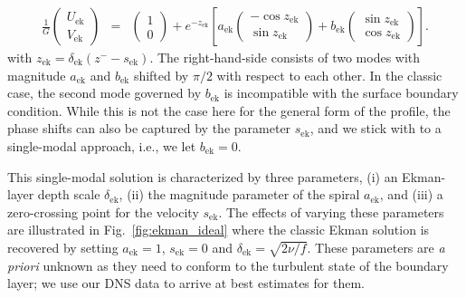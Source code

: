 \documentclass[smallcondensed,final]{svjour3}
\begin{document}
\begin{subequations}
  \label{eqn:profile_ekman}
  \begin{eqnarray}
    \frac{1}{G}\left(\begin{array}{c} 
      U_\mathrm{ek}\\ 
      V_\mathrm{ek}
    \end{array}\right)  &=& \left(\begin{array}{c} 1 \\ 0 \end{array}\right) 
    + e^{-z_\mathrm{ek}} \left[ a_\mathrm{ek}  \left(\begin{array}{r}
      -\cos z_\mathrm{ek} \\ 
      \sin z_\mathrm{ek}
      \end{array}\right)  + b_\mathrm{ek}\left(\begin{array}{r}
        \sin z_\mathrm{ek} \\ \cos z_\mathrm{ek}
        \end{array}\right)\right]. 
  \end{eqnarray}
\end{subequations}
with  $z_\mathrm{ek} = \delta_\mathrm{ek} (z^- -s_\mathrm{ek})$.
% 
The right-hand-side consists of two modes with magnitude $a_\mathrm{ek}$ and $b_\mathrm{ek}$
shifted by $\pi/2$ with respect to each other. 
%
In the classic case, the second mode governed by $b_\mathrm{ek}$ is incompatible with
the surface boundary condition. 
%
While this is not the case here for the general form of the profile, the
phase shifts can also be captured by the parameter $s_\mathrm{ek}$, 
and we stick with to a single-modal approach, i.e., we let $b_\mathrm{ek}=0$. 
%
\par 
%
This single-modal solution is characterized by three parameters,
(i) an Ekman-layer depth scale $\delta_\mathrm{ek}$,
(ii) the magnitude parameter of the spiral $a_\mathrm{ek}$, and
(iii) a zero-crossing point for the velocity $s_\mathrm{ek}$.
%
The effects of varying these parameters are illustrated in Fig.~\ref{fig:ekman_ideal} where
the classic Ekman solution is recovered by setting $a_\mathrm{ek}=1$, $s_\mathrm{ek}=0$ and
$\delta_\mathrm{ek}=\sqrt{2\nu/f}$.
% 
These parameters are \emph{a priori} unknown as they need to conform to the turbulent state of the
boundary layer; we use our DNS data to arrive at best estimates for them.
%
\par
%
\end{document}
